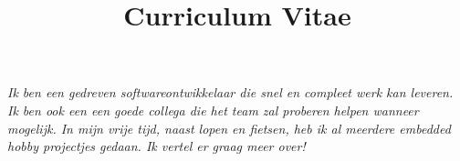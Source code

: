 \documentclass[11pt,a4paper,sans]{moderncv} %
\title{Curriculum Vitae}
\begin{document}




\makecvtitle %



\vspace{-15pt}
\begin{adjustwidth}{50pt}{50pt}
    \textit{Ik ben een gedreven softwareontwikkelaar die snel en compleet werk kan leveren.
    Ik ben ook een een goede collega die het team zal proberen helpen wanneer mogelijk.
    In mijn vrije tijd, naast lopen en fietsen, heb ik al meerdere embedded hobby projectjes gedaan. Ik vertel er graag meer over!}
\end{adjustwidth}
\vspace{10pt}
\end{document}
